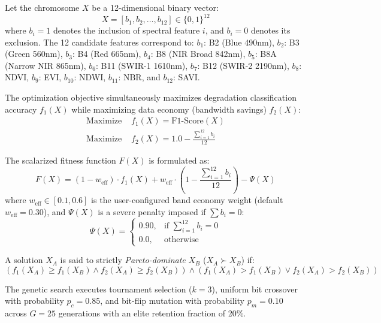 \documentclass[conference]{IEEEtran}
\begin{document}
Let the chromosome $X$ be a 12-dimensional binary vector:
\begin{equation}
X = [b_1, b_2, \dots, b_{12}] \in \{0, 1\}^{12}
\end{equation}
where $b_i = 1$ denotes the inclusion of spectral feature $i$, and $b_i = 0$ denotes its exclusion. The 12 candidate features correspond to: $b_1$: B2 (Blue 490nm), $b_2$: B3 (Green 560nm), $b_3$: B4 (Red 665nm), $b_4$: B8 (NIR Broad 842nm), $b_5$: B8A (Narrow NIR 865nm), $b_6$: B11 (SWIR-1 1610nm), $b_7$: B12 (SWIR-2 2190nm), $b_8$: NDVI, $b_9$: EVI, $b_{10}$: NDWI, $b_{11}$: NBR, and $b_{12}$: SAVI.

The optimization objective simultaneously maximizes degradation classification accuracy $f_1(X)$ while maximizing data economy (bandwidth savings) $f_2(X)$:
\begin{align}
\text{Maximize } & f_1(X) = \text{F1-Score}(X) \\
\text{Maximize } & f_2(X) = 1.0 - \frac{\sum_{i=1}^{12} b_i}{12}
\end{align}

The scalarized fitness function $F(X)$ is formulated as:
\begin{equation}
F(X) = (1 - w_{\text{eff}}) \cdot f_1(X) + w_{\text{eff}} \cdot \left(1 - \frac{\sum_{i=1}^{12} b_i}{12}\right) - \Psi(X)
\end{equation}
where $w_{\text{eff}} \in [0.1, 0.6]$ is the user-configured band economy weight (default $w_{\text{eff}} = 0.30$), and $\Psi(X)$ is a severe penalty imposed if $\sum b_i = 0$:
\begin{equation}
\Psi(X) = \begin{cases} 
0.90, & \text{if } \sum_{i=1}^{12} b_i = 0 \\
0.0, & \text{otherwise}
\end{cases}
\end{equation}

A solution $X_A$ is said to strictly \textit{Pareto-dominate} $X_B$ ($X_A \succ X_B$) if:
\begin{equation}
(f_1(X_A) \ge f_1(X_B) \land f_2(X_A) \ge f_2(X_B)) \land (f_1(X_A) > f_1(X_B) \lor f_2(X_A) > f_2(X_B))
\end{equation}

The genetic search executes tournament selection ($k=3$), uniform bit crossover with probability $p_c = 0.85$, and bit-flip mutation with probability $p_m = 0.10$ across $G = 25$ generations with an elite retention fraction of 20\%.
\end{document}
